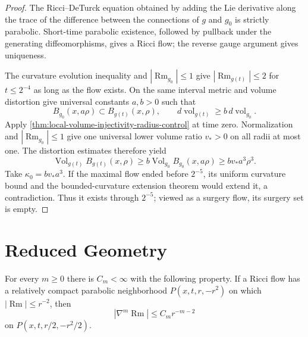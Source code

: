 \begin{proof}
The Ricci--DeTurck equation obtained by adding the Lie derivative along the
trace of the difference between the connections of $g$ and $g_0$ is strictly
parabolic.  Short-time parabolic existence, followed by pullback under the
generating diffeomorphisms, gives a Ricci flow; the reverse gauge argument
gives uniqueness.

The curvature evolution inequality and $|\operatorname{Rm}_{g_0}|\le1$ give
$|\operatorname{Rm}_{g(t)}|\le2$ for $t\le2^{-4}$ as long as the flow
exists.  On the same interval metric and volume distortion give universal
constants $a,b>0$ such that
\[
 B_{g_0}(x,a\rho)\subset B_{g(t)}(x,\rho),
 \qquad
 d\operatorname{vol}_{g(t)}\ge b\,d\operatorname{vol}_{g_0}.
\]
Apply \ref{thm:local-volume-injectivity-radius-control} at time zero.
Normalization and $|\operatorname{Rm}_{g_0}|\le1$ give one universal lower
volume ratio $v_*>0$ on all radii at most one.  The distortion estimates therefore
yield
\[
 \operatorname{Vol}_{g(t)}B_{g(t)}(x,\rho)
 \ge b\operatorname{Vol}_{g_0}B_{g_0}(x,a\rho)
 \ge bv_*a^3\rho^3.
\]
Take $\kappa_0=bv_*a^3$.  If the maximal flow ended before
$2^{-5}$, its uniform curvature bound and the bounded-curvature extension
theorem would extend it, a contradiction.  Thus it exists through $2^{-5}$;
viewed as a surgery flow, its surgery set is empty.
\end{proof}

\section{Reduced Geometry}

\begin{theorem}
\label{thm:local-ricci-flow-derivative-estimates}
\notready
For every $m\ge0$ there is $C_m<\infty$ with the following property.  If a
Ricci flow has a relatively compact parabolic neighborhood
$P(x,t,r,-r^2)$ on which $|\operatorname{Rm}|\le r^{-2}$, then
\[
 |\nabla^m\operatorname{Rm}|
 \le C_m r^{-m-2}
\]
on $P(x,t,r/2,-r^2/2)$.
\end{theorem}


